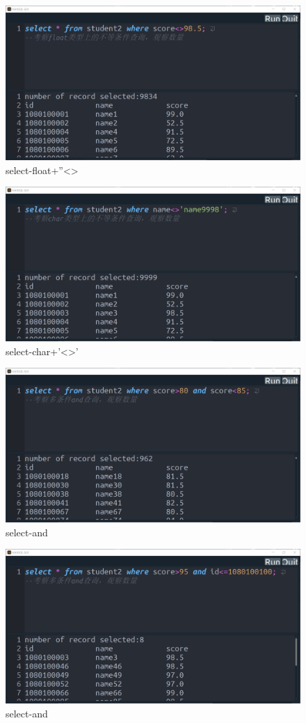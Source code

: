 \documentclass[UTF8]{ctexrep} %
\begin{document}
\begin{figure}[H]
    \centering
    \includegraphics[width=0.8\linewidth]{figure/5.5.png}
    \caption{select-float+''<>}
    \label{fig:runtime5.5}
\end{figure}
\begin{figure}[H]
    \centering
    \includegraphics[width=0.8\linewidth]{figure/5.6.png}
    \caption{select-char+'<>'}
    \label{fig:runtime5.6}
\end{figure}
\begin{figure}[H]
    \centering
    \includegraphics[width=0.8\linewidth]{figure/5.7.png}
    \caption{select-and}
    \label{fig:runtime5.7}
\end{figure}
\begin{figure}[H]
    \centering
    \includegraphics[width=0.8\linewidth]{figure/5.8.png}
    \caption{select-and}
    \label{fig:runtime5.8}
\end{figure}
\end{document}

